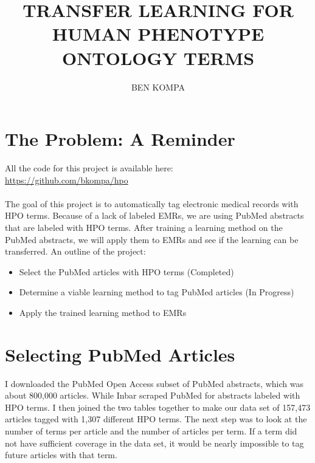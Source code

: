 \documentclass{ws-procs11x85}
\begin{document}
\title{TRANSFER LEARNING FOR HUMAN PHENOTYPE ONTOLOGY TERMS}

\author{BEN KOMPA}

\address{UNC Chapel Hill,\\
E-mail: kompa@live.unc.edu\\}



\bodymatter

\section{The Problem: A Reminder}
All the code for this project is available here: \\ \href{https://github.com/bkompa/hpo}{https://github.com/bkompa/hpo}\\ \\ 
The goal of this project is to automatically tag electronic medical records with HPO terms. Because of a lack of labeled EMRs, we are using PubMed abstracts that are labeled with HPO terms. After training a learning method on the PubMed abstracts, we will apply them to EMRs and see if the learning can be transferred. 
An outline of the project:
\begin{itemize}
\item Select the PubMed articles with HPO terms (Completed)
\item Determine a viable learning method to tag PubMed articles (In Progress)
\item Apply the trained learning method to EMRs 
\end{itemize}

\section{Selecting PubMed Articles}

I downloaded the PubMed Open Access subset of PubMed abstracts, which was about 800,000 articles. While Inbar scraped PubMed for abstracts labeled with HPO terms. I then joined the two tables together to make our data set of 157,473 articles tagged with 1,307 different HPO terms. The next step was to look at the number of terms per article and the number of articles per term. If a term did not have sufficient coverage in the data set, it would be nearly impossible to tag future articles with that term. 
\end{document}

